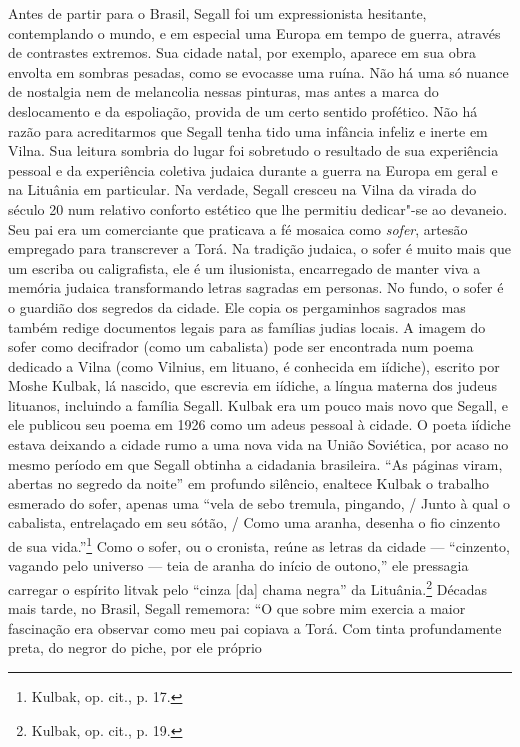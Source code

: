 Antes de partir para o Brasil, Segall foi um expressionista hesitante,
contemplando o mundo, e em especial uma Europa em tempo de guerra,
através de contrastes extremos. Sua cidade natal, por exemplo, aparece
em sua obra envolta em sombras pesadas, como se evocasse uma ruína. Não
há uma só nuance de nostalgia nem de melancolia nessas pinturas, mas
antes a marca do deslocamento e da espoliação, provida de um certo
sentido profético. Não há razão para acreditarmos que Segall tenha tido
uma infância infeliz e inerte em Vilna. Sua leitura sombria do lugar foi
sobretudo o resultado de sua experiência pessoal e da experiência
coletiva judaica durante a guerra na Europa em geral e na Lituânia em
particular. Na verdade, Segall cresceu na Vilna da virada do século 20
num relativo conforto estético que lhe permitiu dedicar"-se ao devaneio.
Seu pai era um comerciante que praticava a fé mosaica como \textit{sofer},
artesão empregado para transcrever a Torá. Na tradição judaica, o sofer
é muito mais que um escriba ou caligrafista, ele é um ilusionista,
encarregado de manter viva a memória judaica transformando letras
sagradas em personas. No fundo, o sofer é o guardião dos segredos da
cidade. Ele copia os pergaminhos sagrados mas também redige documentos
legais para as famílias judias locais. A imagem do sofer como decifrador
(como um cabalista) pode ser encontrada num poema dedicado a Vilna (como
Vilnius, em lituano, é conhecida em iídiche), escrito por Moshe Kulbak,
lá nascido, que escrevia em iídiche, a língua materna dos judeus
lituanos, incluindo a família Segall. Kulbak era um pouco mais novo que
Segall, e ele publicou seu poema em 1926 como um adeus pessoal à cidade.
O poeta iídiche estava deixando a cidade rumo a uma nova vida na União
Soviética, por acaso no mesmo período em que Segall obtinha a cidadania
brasileira. ``As páginas viram, abertas no segredo da noite'' em
profundo silêncio, enaltece Kulbak o trabalho esmerado do sofer, apenas
uma ``vela de sebo tremula, pingando, / Junto à qual o cabalista,
entrelaçado em seu sótão, / Como uma aranha, desenha o fio cinzento de
sua vida.''\footnote{Kulbak, op. cit., p. 17.} Como o sofer, ou o cronista, reúne
as letras da cidade --- ``cinzento, vagando pelo universo --- teia de aranha
do início de outono,'' ele pressagia carregar o espírito litvak pelo
``cinza {[}da{]} chama negra'' da Lituânia.\footnote{Kulbak, op. cit., p. 19.}
Décadas mais tarde, no Brasil, Segall rememora: ``O que sobre mim
exercia a maior fascinação era observar como meu pai copiava a Torá. Com
tinta profundamente preta, do negror do piche, por ele próprio
